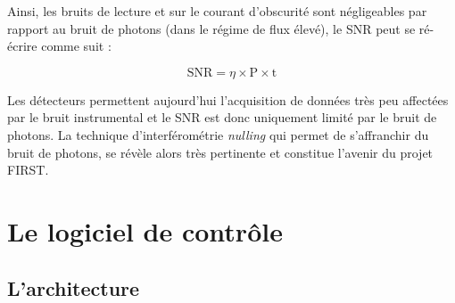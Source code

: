
Ainsi, les bruits de lecture et sur le courant d'obscurité sont négligeables par rapport au bruit de photons (dans le régime de flux élevé), le \ac{SNR} peut se ré-écrire comme suit :

\begin{equation}
    \text{SNR} = \eta \times \text{P} \times \text{t}
\end{equation}

Les détecteurs permettent aujourd'hui l'acquisition de données très peu affectées par le bruit instrumental et le \ac{SNR} est donc uniquement limité par le bruit de photons. La technique d'interférométrie \textit{nulling} qui permet de s'affranchir du bruit de photons, se révèle alors très pertinente et constitue l'avenir du projet \ac{FIRST}.


\section{Le logiciel de contrôle}
\label{sec:ControlSoftware}

\subsection{L'architecture}

